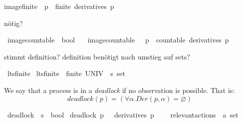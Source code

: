 \begin{isabellebody}
{\isacartoucheopen}image{\isacharunderscore}{\kern0pt}finite\ {\isasymequiv}\ {\isacharparenleft}{\kern0pt}{\isasymforall}p\ {\isasymalpha}{\isachardot}{\kern0pt}\ finite\ {\isacharparenleft}{\kern0pt}derivatives\ p\ {\isasymalpha}{\isacharparenright}{\kern0pt}{\isacharparenright}{\kern0pt}{\isacartoucheclose}%
\begin{isamarkuptext}%
nötig?%
\end{isamarkuptext}\isamarkuptrue%
\isamarkupfalse%
\ image{\isacharunderscore}{\kern0pt}countable\ {\isacharcolon}{\kern0pt}{\isacharcolon}{\kern0pt}\ {\isacartoucheopen}bool{\isacartoucheclose}\isanewline
\ \ \ {\isacartoucheopen}image{\isacharunderscore}{\kern0pt}countable\ {\isasymequiv}\ {\isacharparenleft}{\kern0pt}{\isasymforall}\ p\ {\isasymalpha}{\isachardot}{\kern0pt}\ countable\ {\isacharparenleft}{\kern0pt}derivatives\ p\ {\isasymalpha}{\isacharparenright}{\kern0pt}{\isacharparenright}{\kern0pt}{\isacartoucheclose}%
\begin{isamarkuptext}%
stimmt definition? definition benötigt nach umstieg auf sets?%
\end{isamarkuptext}\isamarkuptrue%
\isamarkupfalse%
\ lts{\isacharunderscore}{\kern0pt}finite\ \isanewline
{\isacartoucheopen}lts{\isacharunderscore}{\kern0pt}finite\ {\isasymequiv}\ {\isacharparenleft}{\kern0pt}finite\ {\isacharparenleft}{\kern0pt}UNIV\ {\isacharcolon}{\kern0pt}{\isacharcolon}{\kern0pt}\ {\isacharprime}{\kern0pt}s\ set{\isacharparenright}{\kern0pt}{\isacharparenright}{\kern0pt}{\isacartoucheclose}%
\begin{isamarkuptext}%
We say that a process is in a \textit{deadlock} if no observation is possible. That is:
$$\mathit{deadlock} (p) = (\forall\alpha .\mathit{Der} (p, \alpha) = \varnothing)$$%
\end{isamarkuptext}\isamarkuptrue%
\isamarkupfalse%
\ deadlock\ {\isacharcolon}{\kern0pt}{\isacharcolon}{\kern0pt}\ {\isacartoucheopen}{\isacharprime}{\kern0pt}s\ {\isasymRightarrow}\ bool{\isacartoucheclose}\ \isanewline
{\isacartoucheopen}deadlock\ p\ {\isasymequiv}\ {\isacharparenleft}{\kern0pt}{\isasymforall}{\isasymalpha}{\isachardot}{\kern0pt}\ derivatives\ p\ {\isasymalpha}\ {\isacharequal}{\kern0pt}\ {\isacharbraceleft}{\kern0pt}{\isacharbraceright}{\kern0pt}{\isacharparenright}{\kern0pt}{\isacartoucheclose}\isanewline
\isanewline
{}\isamarkupfalse%
\ relevant{\isacharunderscore}{\kern0pt}actions\ {\isacharcolon}{\kern0pt}{\isacharcolon}{\kern0pt}\ {\isacartoucheopen}{\isacharprime}{\kern0pt}a\ set{\isacartoucheclose}\isanewline

\end{isabellebody}
